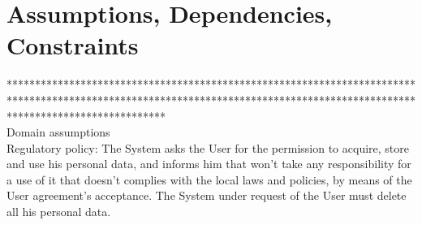 \section{Assumptions, Dependencies, Constraints}
**************************************************************************************************************************************************************************** \\
Domain assumptions
\\
Regulatory policy:
The System asks the User for the permission to acquire, store and use his personal data, and informs him that won't take any responsibility for a use of it that doesn't complies with the local laws and policies, by means of the User agreement's acceptance.
The System under request of the User must delete all his personal data.
%
